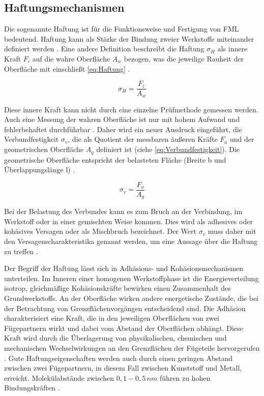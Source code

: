 \subsection{Haftungsmechanismen}\label{sec:Haftung}


Die sogenannte Haftung ist für die Funktionsweise und Fertigung von FML bedeutend. Haftung kann als Stärke der Bindung zweier Werkstoffe miteinander definiert werden \cite{Mann.1994}. Eine andere Definition beschreibt die Haftung $\sigma_H$ als innere Kraft $F_i$ auf die wahre Oberfläche $A_w$ bezogen, was die jeweilige Rauheit der Oberfläche mit einschließt \autoref{eq:Haftung} \cite{Bischof.1993}.

\begin{equation}
\sigma_H = \frac{F_i}{A_w}
\label{eq:Haftung}
\end{equation}

Diese innere Kraft kann nicht durch eine einzelne Prüfmethode gemessen werden. Auch eine Messung der wahren Oberfläche ist nur mit hohem Aufwand und fehlerbehaftet durchführbar \cite{Brockmann.1969}. Daher wird ein neuer Ausdruck eingeführt, die Verbundfestigkeit $\sigma_v$, die als Quotient der messbaren äußeren Kräfte $F_a$ und der geometrischen Oberfläche $A_g$ definiert ist (siehe \autoref{eq:Verbundfestigkeit}). Die geometrische Oberfläche entspricht der belasteten Fläche (Breite b und Überlappungslänge l) \cite{Habenicht.2009}.

\begin{equation}
\sigma_v = \frac{F_a}{A_g}
\label{eq:Verbundfestigkeit}
\end{equation}

Bei der Belastung des Verbundes kann es zum Bruch an der Verbindung, im  Werkstoff oder in einer gemischten Weise kommen. Dies wird als adhesives oder kohäsives Versagen oder als Mischbruch bezeichnet. Der Wert $\sigma_v$ muss daher mit den Versagenscharakteristika genannt werden, um eine Aussage über die Haftung zu treffen \cite{Pan.2016}. 

Der Begriff der Haftung lässt sich in Adhäsions- und Kohäsionsmechanismen unterteilen. Im Inneren einer homogenen Werkstoffphase ist die Energieverteilung isotrop, gleichmäßige Kohäsionskräfte bewirken einen Zusammenhalt des Grundwerkstoffs. An der Oberfläche wirken andere energetische Zustände, die bei der Betrachtung von Grenzflächenvorgängen entscheidend sind. Die Adhäsion charakterisiert eine Kraft, die in den jeweiligen Oberflächen von zwei Fügepartnern wirkt und dabei vom Abstand der Oberflächen abhängt. Diese Kraft wird durch die Überlagerung von physikalischen, chemischen und mechanischen Wechselwirkungen an den Grenzflächen der Fügeteile hervorgerufen \cite{Habenicht.2009}. Gute Haftungseigenschaften werden auch durch einen geringen Abstand zwischen zwei Fügepartnern, in diesem Fall zwischen Kunststoff und Metall, erreicht. Molekülabstände zwischen $0,1 - 0,5\, nm$ führen zu hohen Bindungskräften \cite{Suchentrunk.2007}.

